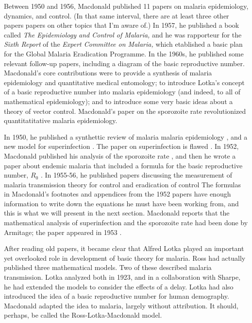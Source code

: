 \documentclass[
]{book}
\begin{document}
Between 1950 and 1956, Macdonald published 11 papers on malaria epidemiology, dynamics, and control.
(In that same interval, there are at least three other papers papers on other topics that I'm aware of.)
In 1957, he published a book called \emph{The Epidemiology and Control of Malaria,} and he was rapporteur for the \emph{Sixth Report} of the \emph{Expert Committee on Malaria,} which etablished a basic plan for the Global Malaria Eradication Programme.
In the 1960s, he published some relevant follow-up papers, including a diagram of the basic reproductive number.
Macdonald's core contributions were to provide a synthesis of malaria epidemiology and quantitative medical entomology; to introduce Lotka's concept of a basic reproductive number into malaria epidemiology (and indeed, to all of mathematical epidemiology); and to introduce some very basic ideas about a theory of vector control. Macdonald's paper on the sporozoite rate revolutionized quantitatitative malaria epidemiology.

In 1950, he published a synthettic review of malaria malaria epidemiology \autocite{MacdonaldG1950Epidemiology}, and a new model for superinfection \autocite{MacdonaldG1950Superinfection}.
The paper on superinfection is flawed \autocite{FinePEM1975SuperinfectionProblem}.
In 1952, Macdonald published his analysis of the sporozoite rate \autocite{MacdonaldG1952Sporozoite}, and then he wrote a paper about endemic malaria that included a formula for the basic reproductive number, \(R_0\) \autocite{MacdonaldG1952R0}.
In 1955-56, he published papers discussing the measurement of malaria transmission theory for control and eradication \autocite{MacdonaldG1955MeasurementMalaria,MacdonaldG1956EpidemiologicalBasis,MacdonaldG1956TheoryEradication} of control
The formulas in Macdonald's footnotes and appendices from the 1952 papers have enough information to write down the equations he must have been working from, and this is what we will present in the next section.
Macdonald reports that the mathematical analysis of superinfection and the sporozoite rate had been done by Armitage; the paper appeared in 1953 \autocite{ArmitageP1953}.

After reading old papers, it became clear that Alfred Lotka played an important yet overlooked role in development of basic theory for malaria.
Ross had actually published three mathematical models.
Two of these described malaria transmission.
Lotka analyzed both in 1923, and in a collaboration with Sharpe, he had extended the models to consider the effects of a delay.
Lotka had also introduced the idea of a basic reproductive number for human demography.
Macdonald adapted the idea to malaria, largely without attribution.
It should, perhaps, be called the Ross-Lotka-Macdonald model.
\end{document}
